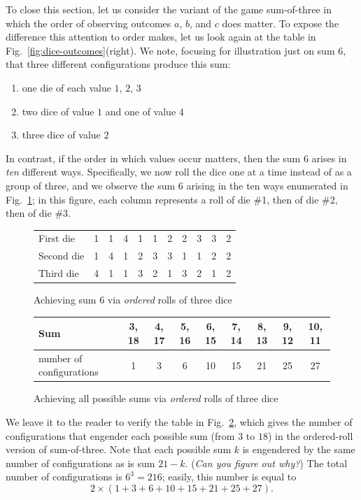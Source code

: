 \bigskip

To close this section, let us consider the variant of the game
sum-of-three in which the order of observing outcomes $a$, $b$, and
$c$ does matter.  To expose the difference this attention to order makes,
let us look again at the table in Fig.~\ref{fig:dice-outcomes}(right).
We note, focusing for illustration just on sum $6$, that three
different configurations produce this sum:
\begin{enumerate}
\item one die of each value $1$, $2$, $3$
\item two dice of value $1$ and one of value $4$
\item three dice of value $2$
\end{enumerate}
In contrast, if the order in which values occur matters, then the
sum $6$ arises in {\em ten} different ways.  Specifically, we now
roll the dice one at a time instead of as a group of three, and we
observe the sum $6$ arising in the ten ways enumerated in
Fig.~\ref{fig:dice-ordered-outcomes}; in this figure, each column
represents a roll of die \#1, then of die \#2, then of die \#3.
\begin{figure}[htb]
\begin{center}
\begin{tabular}{|l||c|c|c|c|c|c|c|c|c|c|}
\hline
First die & 1 & 1 & 4 & 1 & 1 & 2 & 2 & 3 & 3 & 2   \\

Second die & 1 & 4 & 1 & 2 & 3 & 3 & 1 & 1 & 2 & 2   \\

Third die & 4 & 1 & 1 & 3 & 2 & 1 & 3 & 2 & 1 & 2  \\
\hline
\end{tabular}
\end{center}
\caption{Achieving sum $6$ via {\em ordered} rolls of three dice}
\label{fig:dice-ordered-outcomes}
\end{figure}

\medskip

\begin{figure}[htb]
\begin{center}
\begin{tabular}{|l||c|c|c|c|c|c|c|c|}
\hline
Sum & 3, 18 & 4, 17 & 5, 16 & 6, 15 & 7, 14 & 8, 13 & 9, 12 & 10, 11  \\
\hline
number of configurations & 1 & 3 & 6 & 10 & 15 & 21 & 25 & 27  \\
\hline
\end{tabular}
\end{center}
\caption{Achieving all possible sums via {\em ordered} rolls of three dice}
\label{fig:dice-ordered-configs}
\end{figure}
We leave it to the reader to verify the table in
Fig.~\ref{fig:dice-ordered-configs}, which gives the number of
configurations that engender each possible sum (from $3$ to $18$) in
the ordered-roll version of sum-of-three.  Note that each possible sum
$k$ is engendered by the same number of configurations as is sum $21
- k$.  ({\em Can you figure out why?})  The total number of
configurations is $6^3 = 216$; easily, this number is equal to
\[ 2 \times (1 + 3 + 6 + 10 + 15 + 21 + 25 + 27). \]

